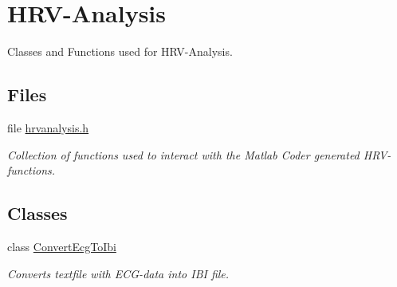 \hypertarget{group__HRV-Analysis}{}\section{H\+R\+V-\/\+Analysis}
\label{group__HRV-Analysis}


Classes and Functions used for H\+R\+V-\/\+Analysis.  


\subsection*{Files}
\begin{DoxyCompactItemize}
\item 
file \hyperlink{hrvanalysis_8h}{hrvanalysis.\+h}
\begin{DoxyCompactList}\small\item\em Collection of functions used to interact with the Matlab Coder generated H\+R\+V-\/functions. \end{DoxyCompactList}\end{DoxyCompactItemize}
\subsection*{Classes}
\begin{DoxyCompactItemize}
\item 
class \hyperlink{classConvertEcgToIbi}{Convert\+Ecg\+To\+Ibi}
\begin{DoxyCompactList}\small\item\em Converts textfile with E\+C\+G-\/data into I\+BI file. \end{DoxyCompactList}\end{DoxyCompactItemize}
